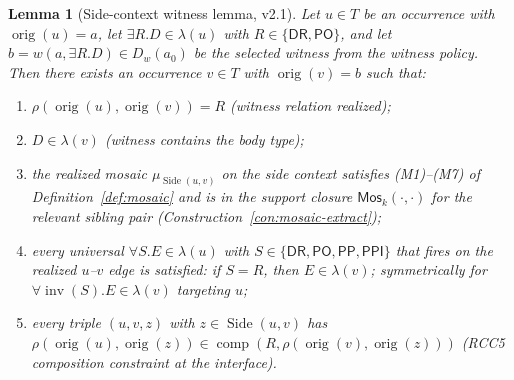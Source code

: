 \documentclass[11pt]{article}
\newtheorem{lemma}[theorem]{Lemma}
\theoremstyle{definition}
\theoremstyle{remark}
\newcommand{\DR}{\mathsf{DR}}
\newcommand{\PO}{\mathsf{PO}}
\newcommand{\PP}{\mathsf{PP}}
\newcommand{\PPI}{\mathsf{PPI}}
\newcommand{\BaseEdge}{\{\DR,\PO,\PP,\PPI\}}
\newcommand{\comp}{\operatorname{comp}}
\newcommand{\inv}{\operatorname{inv}}
\newcommand{\orig}{\operatorname{orig}}
\newcommand{\Mos}{\mathsf{Mos}}
\newcommand{\Side}{\operatorname{Side}}
\begin{document}
\begin{lemma}[Side-context witness lemma, v2.1]
\label{lem:side-context-witness}
Let $u \in T$ be an occurrence with $\orig(u) = a$, let $\exists
R.D \in \lambda(u)$ with $R \in \{\DR,\PO\}$, and let $b =
w(a,\exists R.D) \in D_w(a_0)$ be the selected witness from the
witness policy.  Then there exists an occurrence $v\in T$ with
$\orig(v) = b$ such that:
\begin{enumerate}[label=(W\arabic*),leftmargin=2em]
\item $\rho(\orig(u),\orig(v)) = R$ (witness relation realized);
\item $D \in \lambda(v)$ (witness contains the body type);
\item the realized mosaic $\mu_{\Side(u,v)}$ on the side context
  satisfies (M1)--(M7) of Definition~\ref{def:mosaic} and is in
  the support closure $\Mos_k(\cdot,\cdot)$ for the relevant sibling
  pair (Construction~\ref{con:mosaic-extract});
\item every universal $\forall S.E \in \lambda(u)$ with
  $S\in\BaseEdge$ that fires on the realized $u$--$v$ edge is
  satisfied: if $S = R$, then $E\in\lambda(v)$; symmetrically for
  $\forall \inv(S).E \in \lambda(v)$ targeting $u$;
\item every triple $(u, v, z)$ with $z\in\Side(u,v)$ has
  $\rho(\orig(u),\orig(z)) \in \comp(R, \rho(\orig(v),\orig(z)))$
  (RCC5 composition constraint at the interface).
\end{enumerate}
\end{lemma}
\end{document}
